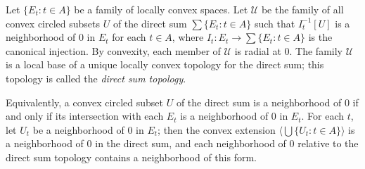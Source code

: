 Let $\{E_t : t \in A\}$ be a family of locally convex spaces. Let $\mathcal{U}$ be the family of all convex circled subsets $U$ of the direct sum $\sum \{E_t : t \in A\}$ such that $I_t^{-1}[U]$ is a neighborhood of $0$ in $E_t$ for each $t \in A$, where $I_t : E_t \to \sum \{E_t : t \in A\}$ is the canonical injection. By convexity, each member of $\mathcal{U}$ is radial at $0$. The family $\mathcal{U}$ is a local base of a unique locally convex topology for the direct sum; this topology is called the \textit{direct sum topology}.

Equivalently, a convex circled subset $U$ of the direct sum is a neighborhood of $0$ if and only if its intersection with each $E_t$ is a neighborhood of $0$ in $E_t$. For each $t$, let $U_t$ be a neighborhood of $0$ in $E_t$; then the convex extension $\langle \bigcup \{U_t : t \in A\} \rangle$ is a neighborhood of $0$ in the direct sum, and each neighborhood of $0$ relative to the direct sum topology contains a neighborhood of this form.
